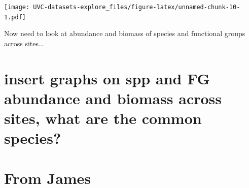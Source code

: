 \documentclass[]{article}
\begin{document}
\texttt{[image: UVC-datasets-explore\_files/figure-latex/unnamed-chunk-10-1.pdf]}

Now need to look at abundance and biomass of species and functional
groups across sites\ldots{}

\section{insert graphs on spp and FG abundance and biomass across sites,
what are the common
species?}\label{insert-graphs-on-spp-and-fg-abundance-and-biomass-across-sites-what-are-the-common-species}

\section{From James}\label{from-james}
\end{document}
